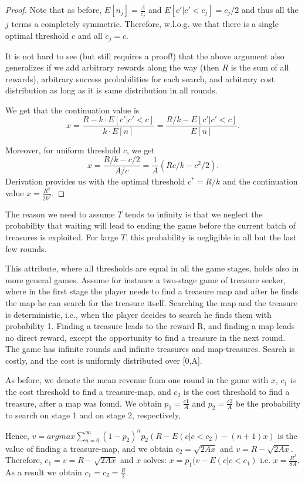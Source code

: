 {\begin{proof}
Note that as before, $E[n_j]=\frac{A}{c_j}$ and $E[c'|c'<c_j] = c_j/2$ and thus all the $j$ terms a completely symmetric. Therefore, w.l.o.g. we that there is a single optimal threshold $c$ and all $c_j=c$.

\medskip
It is not hard to see (but still requires a proof!) that the above argument also generalizes if we add arbitrary rewards along the way (then $R$ is the sum of all rewards),  arbitrary success probabilities for each  search, and arbitrary cost distribution as long as it is same distribution in all rounds.

\medskip
We get that the continuation value is 
$$x=  \frac{R-k\cdot E[c'|c'<c]}{k\cdot E[n]} = \frac{R/k- E[c'|c'<c]}{E[n]}.$$

Moreover, for uniform threshold $c$, we get
$$x = \frac{R/k - c/2}{A/c} = \frac{1}{A}(Rc/k-c^2/2).$$
Derivation provides us with the optimal threshold $c^*=R/k$ and the continuation value
$x=\frac{R^2}{2k^2}$.
\end{proof}

The reason we need to assume $T$ tends to infinity is that we neglect the probability that waiting will lead to ending the game before the current batch of treasures is exploited. For large $T$, this probability is negligible in all but the last few rounds.
} 
This attribute, where all thresholds are equal in all the game stages,  holds also in more general games. Assume for instance a two-stage game of treasure seeker, where in the first stage the player needs to find a treasure map and after he finds the map he can search for the treasure itself. Searching the map and the treasure is deterministic, i.e., when the player decides to search he finds them with probability 1. Finding a treasure leads to the reward R, and finding a map leads no direct reward, except the opportunity to find a treasure in the next round. The game has infinite rounds and infinite treasures and map-treasures. Search is costly, and the cost is uniformly distributed over [0,A]. 

As before, we denote the mean revenue from one round in the game with $x$, $c_1$ is the cost threshold to find a treasure-map, and $c_2$ is the cost threshold to find a treasure, after a map was found. We obtain $p_1=\frac{c1}{A}$ and $p_2=\frac{c2}{A}$ be the probability to search on stage 1 and on stage 2, respectively,

Hence, $v=argmax\sum_{n=0}^\infty(1-p_2)^np_2(R-E(c|c<c_2)-(n+1)x)$ is the value of finding a treasure-map, and we obtain $c_2=\sqrt{2Ax}$ and $v=R-\sqrt{2Ax}$. Therefore, $c_1=v=R-\sqrt{2Ax}$ and $x$ solves: $x=p_1(v-E(c|c<c_1)$ i.e. $x=\frac{R^2}{8A}$. As a result we obtain $c_1=c_2=\frac{R}{2}$.

